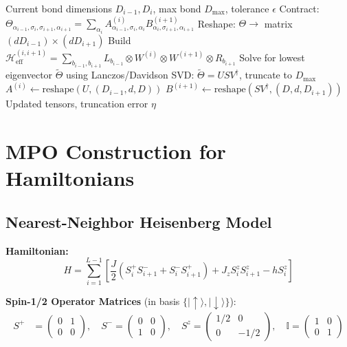 \documentclass[aps,prb,onecolumn,scriptaddress]{revtex4-2}
\newcommand{\ket}[1]{|#1\rangle}
\newcommand{\Id}{\mathbb{I}}
\newcommand{\eps}{\epsilon}
\begin{document}
	\begin{algorithm}[H]
		\caption{TwoSiteUpdate}
		\begin{algorithmic}[1]
			\Require Current bond dimensions $D_{i-1}, D_i$, max bond $D_{\max}$, tolerance $\eps$					
			\State Contract: $\Theta_{\alpha_{i-1},\sigma_i,\sigma_{i+1},\alpha_{i+1}} = \sum_{\alpha_i} A^{(i)}_{\alpha_{i-1},\sigma_i,\alpha_i} B^{(i+1)}_{\alpha_i,\sigma_{i+1},\alpha_{i+1}}$
			\State Reshape: $\Theta \to$ matrix $(d D_{i-1}) \times (d D_{i+1})$
			\State Build $\mathcal{H}_{\text{eff}}^{(i,i+1)} = \sum_{b_{i-1}, b_{i+1}} L_{b_{i-1}} \otimes W^{(i)} \otimes W^{(i+1)} \otimes R_{b_{i+1}}$
			\State Solve for lowest eigenvector $\tilde{\Theta}$ using Lanczos/Davidson
			\State SVD: $\tilde{\Theta} = U S V^\dagger$, truncate to $D_{\max}$
			\State $A^{(i)} \gets \text{reshape}(U, (D_{i-1}, d, D))$
			\State $B^{(i+1)} \gets \text{reshape}(S V^\dagger, (D, d, D_{i+1}))$
			\State \Return Updated tensors, truncation error $\eta$
		\end{algorithmic}
	\end{algorithm}
	
	\section{MPO Construction for Hamiltonians}
	\label{sec:mpo}
	
	\subsection{Nearest-Neighbor Heisenberg Model}
	
	\textbf{Hamiltonian:}
	\begin{equation}
		H = \sum_{i=1}^{L-1} \left[ \frac{J}{2}(S_i^+ S_{i+1}^- + S_i^- S_{i+1}^+) + J_z S_i^z S_{i+1}^z - h S_i^z \right]
	\end{equation}
	
	\textbf{Spin-1/2 Operator Matrices} (in basis $\{\ket{\uparrow}, \ket{\downarrow}\}$):
	\begin{align}
		S^+ &= \begin{pmatrix} 0 & 1 \\ 0 & 0 \end{pmatrix}, \quad
		S^- = \begin{pmatrix} 0 & 0 \\ 1 & 0 \end{pmatrix}, \quad
		S^z = \begin{pmatrix} 1/2 & 0 \\ 0 & -1/2 \end{pmatrix}, \quad
		\Id = \begin{pmatrix} 1 & 0 \\ 0 & 1 \end{pmatrix}
	\end{align}
	
\end{document}
